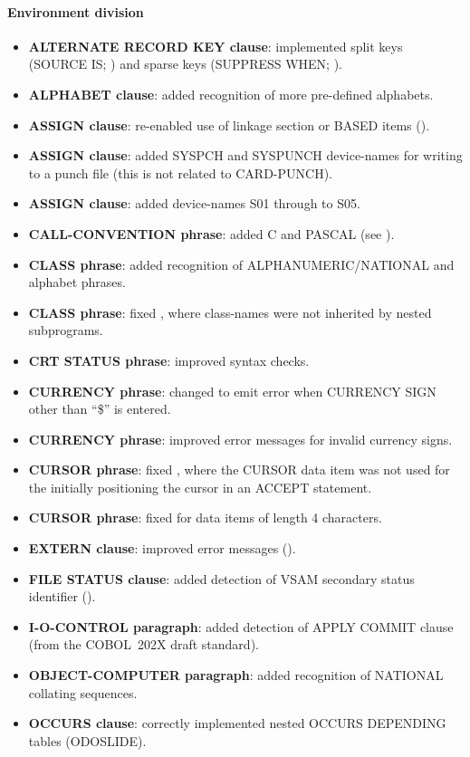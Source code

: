 \paragraph{Environment division}
\begin{itemize}
\item \textbf{ALTERNATE RECORD KEY clause}: implemented split keys (SOURCE IS; ) and sparse keys (SUPPRESS WHEN; ).
\item \textbf{ALPHABET clause}: added recognition of more pre-defined alphabets.
\item \textbf{ASSIGN clause}: re-enabled use of linkage section or BASED items ().
\item \textbf{ASSIGN clause}: added SYSPCH and SYSPUNCH device-names for writing to a punch file (this is not related to CARD-PUNCH).
\item \textbf{ASSIGN clause}: added device-names S01 through to S05.
\item \textbf{CALL-CONVENTION phrase}: added C and PASCAL (see ).
\item \textbf{CLASS phrase}: added recognition of ALPHANUMERIC\slash{}NATIONAL and alphabet phrases.
\item \textbf{CLASS phrase}: fixed , where class-names were not inherited by nested subprograms.
\item \textbf{CRT STATUS phrase}: improved syntax checks.
\item \textbf{CURRENCY phrase}: changed to emit error when CURRENCY SIGN other than ``\$'' is entered.
\item \textbf{CURRENCY phrase}: improved error messages for invalid currency signs.
\item \textbf{CURSOR phrase}: fixed , where the CURSOR data item was not used for the initially positioning the cursor in an ACCEPT statement.
\item \textbf{CURSOR phrase}: fixed for data items of length 4 characters.
\item \textbf{EXTERN clause}: improved error messages ().
\item \textbf{FILE STATUS clause}: added detection of VSAM secondary status identifier ().
\item \textbf{I-O-CONTROL paragraph}: added detection of APPLY COMMIT clause (from the COBOL~202X draft standard).
\item \textbf{OBJECT-COMPUTER paragraph}: added recognition of NATIONAL collating sequences.
\item \textbf{OCCURS clause}: correctly implemented nested OCCURS DEPENDING tables (ODOSLIDE).

\end{itemize}
